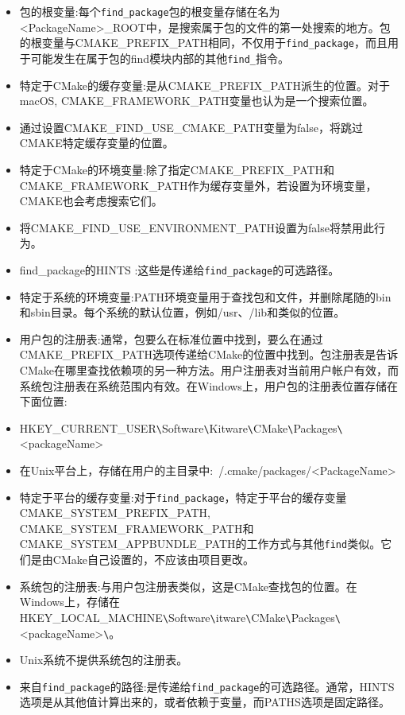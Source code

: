 \begin{itemize}
\item 
包的根变量:每个\texttt{find\_package}包的根变量存储在名为<PackageName>\_ROOT中，是搜索属于包的文件的第一处搜索的地方。包的根变量与CMAKE\_PREFIX\_PATH相同，不仅用于\texttt{find\_package}，而且用于可能发生在属于包的find模块内部的其他\texttt{find\_}指令。

\item 
特定于CMake的缓存变量:是从CMAKE\_PREFIX\_PATH派生的位置。对于macOS, CMAKE\_FRAMEWORK\_PATH变量也认为是一个搜索位置。

\item 
通过设置CMAKE\_FIND\_USE\_CMAKE\_PATH变量为false，将跳过CMAKE特定缓存变量的位置。

\item 
特定于CMake的环境变量:除了指定CMAKE\_PREFIX\_PATH和CMAKE\_FRAMEWORK\_PATH作为缓存变量外，若设置为环境变量，CMAKE也会考虑搜索它们。

\item 
将CMAKE\_FIND\_USE\_ENVIRONMENT\_PATH设置为false将禁用此行为。

\item 
find\_package的HINTS :这些是传递给\texttt{find\_package}的可选路径。

\item 
特定于系统的环境变量:PATH环境变量用于查找包和文件，并删除尾随的bin和sbin目录。每个系统的默认位置，例如/usr、/lib和类似的位置。

\item 
用户包的注册表:通常，包要么在标准位置中找到，要么在通过CMAKE\_PREFIX\_PATH选项传递给CMake的位置中找到。包注册表是告诉CMake在哪里查找依赖项的另一种方法。用户注册表对当前用户帐户有效，而系统包注册表在系统范围内有效。在Windows上，用户包的注册表位置存储在下面位置:

\item 
HKEY\_CURRENT\_USER\verb|\|Software\verb|\|Kitware\verb|\|CMake\verb|\|Packages\verb|\|<packageName>\

\item 
在Unix平台上，存储在用户的主目录中:~/.cmake/packages/<PackageName>

\item 
特定于平台的缓存变量:对于\texttt{find\_package}，特定于平台的缓存变量CMAKE\_SYSTEM\_PREFIX\_PATH, CMAKE\_SYSTEM\_FRAMEWORK\_PATH和CMAKE\_SYSTEM\_APPBUNDLE\_PATH的工作方式与其他\texttt{find}类似。它们是由CMake自己设置的，不应该由项目更改。

\item 
系统包的注册表:与用户包注册表类似，这是CMake查找包的位置。在Windows上，存储在 HKEY\_LOCAL\_MACHINE\verb|\|Software\verb|\|itware\verb|\|CMake\verb|\|Packages\verb|\|<packageName>\verb|\|。

\item 
Unix系统不提供系统包的注册表。

\item 
来自\texttt{find\_package}的路径:是传递给\texttt{find\_package}的可选路径。通常，HINTS选项是从其他值计算出来的，或者依赖于变量，而PATHS选项是固定路径。
\end{itemize}

